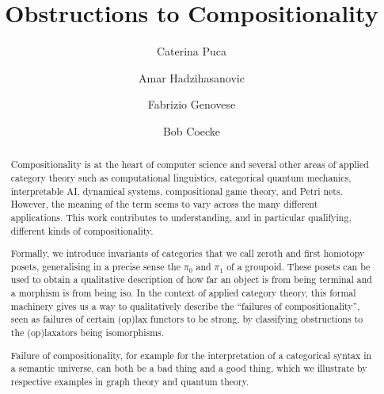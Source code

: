 \documentclass[submission]{eptcs}
\begin{document}
    \title{Obstructions to Compositionality}

    \author{        
        Caterina Puca
        \and
        Amar Hadzihasanovic
        \and
        Fabrizio Genovese
        \and
        Bob Coecke
    }

    \def\titlerunning{Obstructions to Compositionality}
    \def\authorrunning{Puca, Hadzihasanovic, Genovese, Coecke}

    \maketitle
    \begin{abstract}

Compositionality is at the heart of computer science and several other areas of applied category theory such as computational linguistics, categorical quantum mechanics, interpretable AI, dynamical systems, compositional game theory, and Petri nets. 
However, the meaning of the term seems to vary across the many different applications.
This work contributes to understanding, and in particular qualifying, different kinds of compositionality.

Formally, we introduce invariants of categories that we call zeroth and first homotopy posets, generalising in a precise sense the $\pi_0$ and $\pi_1$ of a groupoid.
These posets can be used to obtain a qualitative description of how far an object is from being terminal and a morphism is from being iso.
In the context of applied category theory, this formal machinery gives us a way to qualitatively describe the ``failures of compositionality'', seen as failures of certain (op)lax functors to be strong, by classifying obstructions to the (op)laxators being isomorphisms. 

Failure of compositionality, for example for the interpretation of a categorical syntax in a semantic universe, can both be a bad thing and a good thing, which we illustrate by respective examples in graph theory and quantum theory.

    \end{abstract}
\end{document}
